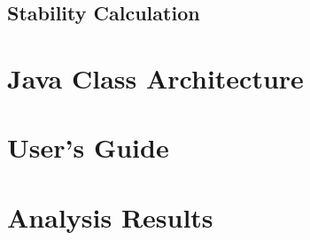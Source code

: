 \subsection{Stability Calculation}


\section{Java Class Architecture}

\section{User's Guide}

\section{Analysis Results} %
